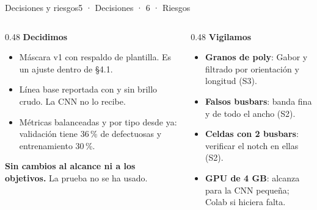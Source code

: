 \documentclass[aspectratio=169,11pt]{beamer}
\newcommand{\cab}[1]{{\color{ud}\bfseries #1}\par\vspace{-2pt}{\color{ud}\rule{\linewidth}{0.4pt}}\par\vspace{2pt}}
\begin{document}
\begin{frame}{Decisiones y riesgos}{5 · Decisiones · 6 · Riesgos}
  \begin{columns}[t]
    \begin{column}{0.48\textwidth}
      \cab{Decidimos}
      \small
      \begin{itemize}
        \item Máscara v1 con respaldo de plantilla. Es un ajuste dentro de §4.1.
        \item Línea base reportada con y sin brillo crudo. La CNN no lo recibe.
        \item Métricas balanceadas y por tipo desde ya: validación tiene 36\,\% de defectuosas y entrenamiento 30\,\%.
      \end{itemize}
      \vspace{0.15cm}
      {\color{ud}\bfseries Sin cambios al alcance ni a los objetivos.} La prueba no se ha usado.
    \end{column}
    \begin{column}{0.48\textwidth}
      \cab{Vigilamos}
      \small
      \begin{itemize}
        \item \textbf{Granos de poly}: Gabor y filtrado por orientación y longitud (S3).
        \item \textbf{Falsos busbars}: banda fina y de todo el ancho (S2).
        \item \textbf{Celdas con 2 busbars}: verificar el notch en ellas (S2).
        \item \textbf{GPU de 4 GB}: alcanza para la CNN pequeña; Colab si hiciera falta.
      \end{itemize}
    \end{column}
  \end{columns}
\end{frame}
\end{document}
